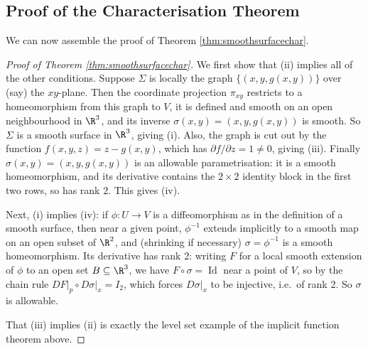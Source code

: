 \subsection{Proof of the Characterisation Theorem}

We can now assemble the proof of Theorem \ref{thm:smoothsurfacechar}.

\begin{proof}[Proof of Theorem \ref{thm:smoothsurfacechar}]
    We first show that (ii) implies all of the other conditions. Suppose $\Sigma$ is locally the graph $\{(x, y, g(x, y))\}$ over (say) the $xy$-plane. Then the coordinate projection $\pi_{xy}$ restricts to a homeomorphism from this graph to $V$, it is defined and smooth on an open neighbourhood in $\R^3$, and its inverse $\sigma(x, y) = (x, y, g(x, y))$ is smooth. So $\Sigma$ is a smooth surface in $\R^3$, giving (i). Also, the graph is cut out by the function $f(x, y, z) = z - g(x, y)$, which has $\partial f/\partial z = 1 \neq 0$, giving (iii). Finally $\sigma(x, y) = (x, y, g(x,y))$ is an allowable parametrisation: it is a smooth homeomorphism, and its derivative contains the $2 \times 2$ identity block in the first two rows, so has rank $2$. This gives (iv).

    Next, (i) implies (iv): if $\phi: U \rightarrow V$ is a diffeomorphism as in the definition of a smooth surface, then near a given point, $\phi^{-1}$ extends implicitly to a smooth map on an open subset of $\R^2$, and (shrinking if necessary) $\sigma = \phi^{-1}$ is a smooth homeomorphism. Its derivative has rank 2: writing $F$ for a local smooth extension of $\phi$ to an open set $B \subseteq \R^3$, we have $F \circ \sigma = \operatorname{Id}$ near a point of $V$, so by the chain rule $\left.DF\right|_p \circ \left.D\sigma\right|_x = I_2$, which forces $\left.D\sigma\right|_x$ to be injective, i.e.\ of rank 2. So $\sigma$ is allowable.

    That (iii) implies (ii) is exactly the level set example of the implicit function theorem above.


\end{proof}
